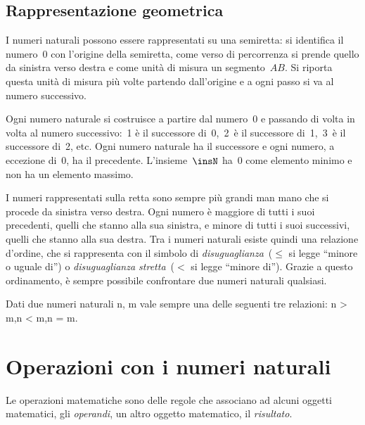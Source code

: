 \subsection{Rappresentazione geometrica}
I numeri naturali possono essere rappresentati su una semiretta: 
si identifica il numero~0 con l'origine della semiretta, come verso di 
percorrenza si prende quello da sinistra verso destra e come unità di 
misura un segmento~\(AB\). 
Si riporta questa unità di misura più volte partendo dall'origine e a ogni 
passo si va al numero successivo.

\begin{inaccessibleblock}
\begin{center}
 
\end{center}
\end{inaccessibleblock}

Ogni numero naturale si costruisce a partire dal numero~0 e passando di 
volta in volta al numero successivo:~1 è il successore di~0,~2~è il 
successore di~1,~3~è il successore di~2, etc. 
Ogni numero naturale ha il successore e ogni numero, a eccezione di~0, ha il
precedente. 
L'insieme~\(\insN\) ha~0 come elemento minimo e non ha un elemento massimo.

I numeri rappresentati sulla retta sono sempre più grandi man mano che si 
procede da sinistra verso destra. 
Ogni numero è maggiore di tutti i suoi precedenti, quelli che stanno alla 
sua sinistra, e minore di tutti i suoi successivi, quelli che stanno alla 
sua destra. 
Tra i numeri naturali esiste quindi una relazione d'ordine, che si 
rappresenta con il simbolo di 
\emph{disuguaglianza}~(\(\le\) si legge ``minore o uguale di'') o 
\emph{disuguaglianza stretta}~(\(<\) si legge ``minore di'').
Grazie a questo ordinamento, è sempre possibile confrontare due numeri 
naturali qualsiasi.

\begin{legge}[di tricotomia]
Dati due numeri naturali n, m vale sempre una delle seguenti tre relazioni: 
\quad n > m,\quad n < m,\quad n = m.
\end{legge}

\section{Operazioni con i numeri naturali}
\label{sec:01_operazioni}

Le operazioni matematiche sono delle regole che associano ad
alcuni oggetti matematici, gli \emph{operandi}, un altro oggetto 
matematico, il \emph{risultato}.

